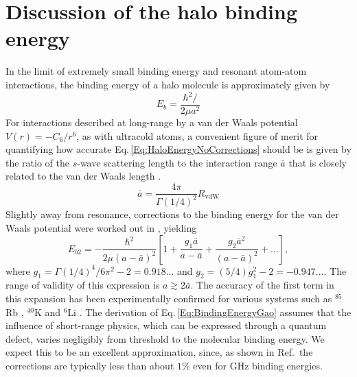 \section{Discussion of the halo binding energy} \label{sec:lowE_alt}
In the limit of extremely small binding energy and resonant atom-atom interactions, the binding energy of a halo molecule is approximately given by \cite{Kohler2006, hle57, Chin2010}
\begin{equation} \label{Eq:HaloEnergyNoCorrections}
	E_b=\frac{\hbar^2/}{2\mu a^2}
\end{equation}
For interactions described at long-range by a van der Waals potential $V(r)=-C_6/r^6$, as with ultracold atoms, a convenient figure of merit for quantifying how accurate Eq.\,\ref{Eq:HaloEnergyNoCorrections} should be is given by the ratio of the $s$-wave scattering length to the interaction range $\bar{a}$ that is closely related to the van der Waals length \cite{gfl93,cju05}.
\begin{equation} \label{Eq:InteractionRangevdW}
  \bar{a} = \frac{4 \pi}{\Gamma(1/4)^2}R_\mathrm{vdW}
\end{equation}
Slightly away from resonance, corrections to the binding energy for the van der Waals potential were worked out in \cite{Gao01,gao04}, yielding
\begin{equation} \label{Eq:BindingEnergyGao}
	E_{b2}=-\frac{\hbar^2}{2\mu(a-\bar{a})^2}\left[1+\frac{g_1\bar{a}}{a-\bar{a}}+\frac{g_2\bar{a}^2}{(a-\bar{a})^2} + ... \right],
\end{equation}
where $g_1=\Gamma(1/4)^4/6\pi^2-2=0.918...$ and $g_2=(5/4)g_1^2-2=-0.947...$. 
The range of validity of this expression is $a \gtrsim 2 \bar{a}$.
The accuracy of the first term in this expansion has been experimentally confirmed for various systems such as $^{85}$Rb \cite{ckt03,kgb03}, $^{40}$K \cite{rtb03,msg05} and $^{6}$Li \cite{bar05}.
The derivation of Eq.\,\ref{Eq:BindingEnergyGao} assumes that the influence of short-range physics, which can be expressed through a quantum defect, varies negligibly from threshold to the molecular binding energy.
We expect this to be an excellent approximation, since, as shown in Ref.\,\cite{Gao01} the corrections are typically less than about $1\%$ even for GHz binding energies.

